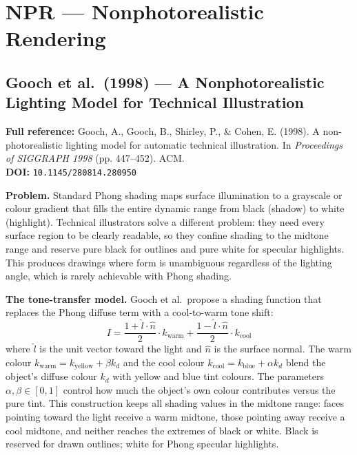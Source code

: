 \documentclass[11pt, a4paper]{article}
\begin{document}
\vspace{8pt}

\section{NPR --- Nonphotorealistic Rendering}

\subsection{Gooch et al.\ (1998) --- A Nonphotorealistic Lighting Model for Technical Illustration}

\begin{refbox}
\textbf{Full reference:} Gooch, A., Gooch, B., Shirley, P., \& Cohen, E. (1998). A non-photorealistic lighting model for automatic technical illustration. In \textit{Proceedings of SIGGRAPH 1998} (pp. 447--452). ACM.\\[4pt]
\textbf{DOI:} \texttt{10.1145/280814.280950}
\end{refbox}

\textbf{Problem.} Standard Phong shading maps surface illumination to a grayscale or colour gradient that fills the entire dynamic range from black (shadow) to white (highlight). Technical illustrators solve a different problem: they need every surface region to be clearly readable, so they confine shading to the midtone range and reserve pure black for outlines and pure white for specular highlights. This produces drawings where form is unambiguous regardless of the lighting angle, which is rarely achievable with Phong shading.

\textbf{The tone-transfer model.} Gooch et al.\ propose a shading function that replaces the Phong diffuse term with a cool-to-warm tone shift:
\[
  I = \frac{1 + \hat{l} \cdot \hat{n}}{2} \cdot k_{\text{warm}} + \frac{1 - \hat{l} \cdot \hat{n}}{2} \cdot k_{\text{cool}}
\]
where $\hat{l}$ is the unit vector toward the light and $\hat{n}$ is the surface normal. The warm colour $k_{\text{warm}} = k_{\text{yellow}} + \beta k_d$ and the cool colour $k_{\text{cool}} = k_{\text{blue}} + \alpha k_d$ blend the object's diffuse colour $k_d$ with yellow and blue tint colours. The parameters $\alpha, \beta \in [0, 1]$ control how much the object's own colour contributes versus the pure tint. This construction keeps all shading values in the midtone range: faces pointing toward the light receive a warm midtone, those pointing away receive a cool midtone, and neither reaches the extremes of black or white. Black is reserved for drawn outlines; white for Phong specular highlights.
\end{document}
